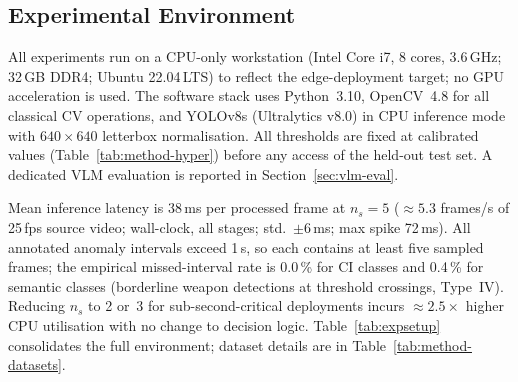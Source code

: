 \documentclass[sensors,article,submit,pdftex,moreauthors]{Definitions/mdpi}
\begin{document}
\subsection{Experimental Environment}
\label{sec:expenv}
 
All experiments run on a CPU-only workstation (Intel Core i7, 8 cores, 3.6\,GHz; 32\,GB DDR4; Ubuntu 22.04\,LTS) to reflect the edge-deployment target; no GPU acceleration is used. The software stack uses Python~3.10, OpenCV~4.8 for all classical CV operations, and YOLOv8s (Ultralytics v8.0) in CPU inference mode with $640{\times}640$ letterbox normalisation. All thresholds are fixed at calibrated values (Table~\ref{tab:method-hyper}) before any access of the held-out test set. A dedicated VLM evaluation is reported in Section~\ref{sec:vlm-eval}.
 
Mean inference latency is 38\,ms per processed frame at $n_s=5$ (${\approx}5.3$ frames/s of 25\,fps source video; wall-clock, all stages; std.\ $\pm$6\,ms; max spike 72\,ms). All annotated anomaly intervals exceed 1\,s, so each contains at least five sampled frames; the empirical missed-interval rate is 0.0\,\% for CI classes and 0.4\,\% for semantic classes (borderline weapon detections at threshold crossings, Type~IV). Reducing $n_s$ to 2 or~3 for sub-second-critical deployments incurs ${\approx}2.5{\times}$ higher CPU utilisation with no change to decision logic. Table~\ref{tab:expsetup} consolidates the full environment; dataset details are in Table~\ref{tab:method-datasets}.
 
\end{document}
